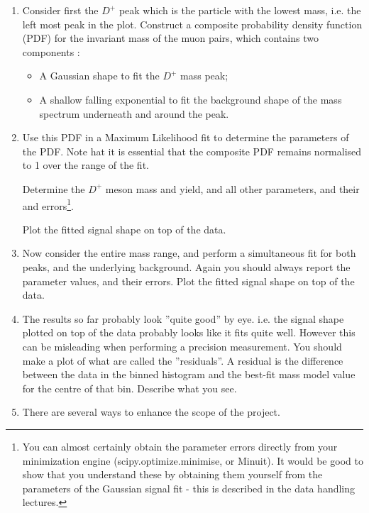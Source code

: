 \begin{enumerate}

\item Consider first the $D^+$ peak which is the particle with the lowest
mass, i.e. the left most peak in the plot. Construct a composite probability density
function (PDF) for the invariant mass of the muon pairs, which
contains two components : 
\begin{itemize}
\item A Gaussian shape to fit the  $D^+$ mass peak;
\item A shallow falling exponential to fit the background shape of the mass spectrum underneath and around the peak.
\end{itemize}

\item	Use this PDF in a Maximum Likelihood fit to determine the parameters of the PDF. Note hat it is essential that the composite PDF remains normalised to 1 over the range of the fit.

Determine the $D^+$  meson mass and yield, and all other parameters, and their and errors\footnote{You can almost certainly obtain the parameter errors directly from your minimization engine (scipy.optimize.minimise, or Minuit). It would be good to show that you understand these by obtaining them yourself from the parameters of the Gaussian signal fit - this is described in the data handling lectures.}.

Plot the fitted signal shape on top of the data.

\item Now consider the entire mass range, and perform a simultaneous fit for both
peaks, and the underlying background. Again you should always report the parameter
values, and their errors. Plot the fitted signal shape on top of the data.
\item The results so far probably look ”quite good” by eye. i.e. the signal shape plotted on
top of the data probably looks like it fits quite well. However this can be misleading
when performing a precision measurement. You should make a plot of what are called
the ”residuals”. A residual is the difference between the data in the binned histogram
and the best-fit mass model value for the centre of that bin. Describe what you see.
\item There are several ways to enhance the scope of the project.


\end{enumerate}
